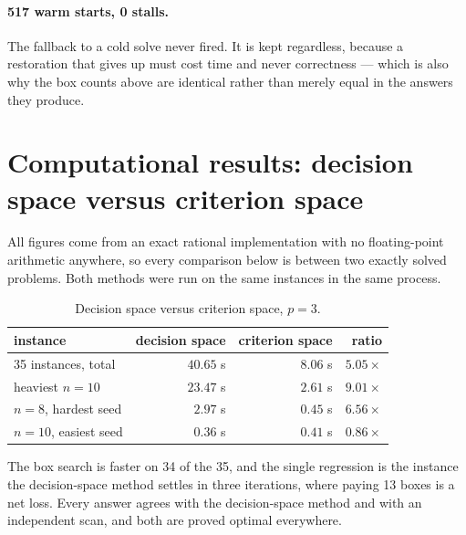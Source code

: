 \documentclass[11pt,a4paper]{article}
\begin{document}
\paragraph{517 warm starts, 0 stalls.} The fallback to a cold solve never
fired. It is kept regardless, because a restoration that gives up must cost
time and never correctness --- which is also why the box counts above are
identical rather than merely equal in the answers they produce.

\section{Computational results: decision space versus criterion space}
\label{sec:results}

All figures come from an exact rational implementation with no floating-point
arithmetic anywhere, so every comparison below is between two exactly solved
problems. Both methods were run on the same instances in the same process.

\begin{table}[h]
\centering
\caption{Decision space versus criterion space, $p = 3$.}
\begin{tabular}{lrrr}
\toprule
instance & decision space & criterion space & ratio \\
\midrule
35 instances, total & $40.65$ s & $8.06$ s & $5.05\times$ \\
heaviest $n=10$     & $23.47$ s & $2.61$ s & $9.01\times$ \\
$n=8$, hardest seed & $2.97$ s  & $0.45$ s & $6.56\times$ \\
$n=10$, easiest seed& $0.36$ s  & $0.41$ s & $0.86\times$ \\
\bottomrule
\end{tabular}
\end{table}

The box search is faster on 34 of the 35, and the single regression is the
instance the decision-space method settles in three iterations, where paying 13
boxes is a net loss. Every answer agrees with the decision-space method and
with an independent scan, and both are proved optimal everywhere.
\end{document}
